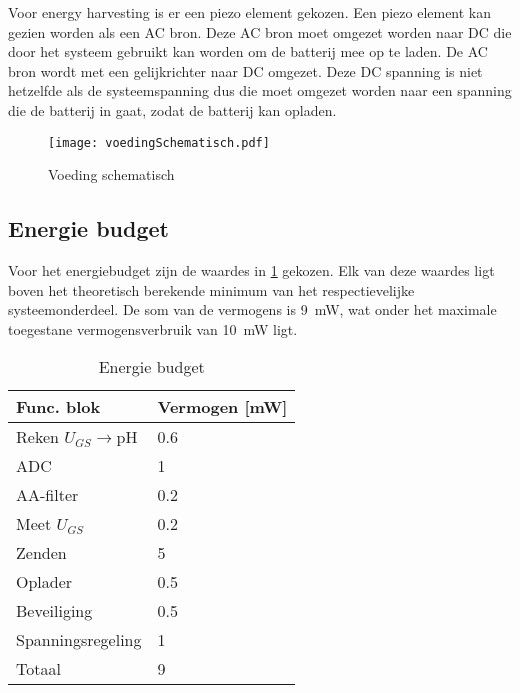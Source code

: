 Voor energy harvesting is er een piezo element gekozen. Een piezo element kan gezien worden als een AC bron. Deze AC bron moet omgezet worden naar DC die door het systeem gebruikt kan worden om de batterij mee op te laden. De AC bron wordt met een gelijkrichter naar DC omgezet. Deze DC spanning is niet hetzelfde als de systeemspanning dus die moet omgezet worden naar een spanning die de batterij in gaat, zodat de batterij kan opladen.

\begin{figure}[!htbp]
    \centering
    \texttt{[image: voedingSchematisch.pdf]}
    \caption{Voeding schematisch}
    \label{fig:voedingSchematisch}
\end{figure}



\subsection{Energie budget}\label{sec:energyBudgets}
Voor het energiebudget zijn de waardes in \cref{tab:energieBudgetEstimatie} gekozen. Elk van deze waardes ligt boven het theoretisch berekende minimum van het respectievelijke systeemonderdeel. De som van de vermogens is \qty{9}{\milli\watt}, wat onder het maximale toegestane vermogensverbruik van \qty{10}{\milli\watt} ligt.


\begin{table}[!htbp]
    \centering
    \begin{tabular}{l|l}
        Func. blok          & Vermogen [mW] \\
        \hline
        Reken $U_{GS}\rightarrow$pH & 0.6   \\
        ADC                 & 1             \\
        AA-filter           & 0.2           \\
        Meet $U_{GS}$       & 0.2           \\
        Zenden              & 5             \\
        Oplader             & 0.5           \\
        Beveiliging         & 0.5           \\
        Spanningsregeling   & 1             \\
        \hline
        \hline
        Totaal              & 9

    \end{tabular}
    \caption{Energie budget}
    \label{tab:energieBudgetEstimatie}
\end{table}


